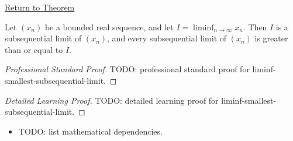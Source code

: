 \newpage
{}
\label{prf:liminf-smallest-subsequential-limit}

\begin{remark*}[Return]
\hyperref[thm:liminf-smallest-subsequential-limit]{Return to Theorem}
\end{remark*}

\begin{theorem*}
Let $(x_n)$ be a bounded real sequence, and let
$I=\liminf_{n\to\infty}x_n$. Then $I$ is a subsequential limit of
$(x_n)$, and every subsequential limit of $(x_n)$ is greater than or
equal to $I$.

\smallskip
\noindent
\end{theorem*}

\begin{proof}[Professional Standard Proof]
\LRAProofBodyStart
TODO: professional standard proof for liminf-smallest-subsequential-limit.
\end{proof}

\begin{proof}[Detailed Learning Proof]
\LRAProofBodyStart
TODO: detailed learning proof for liminf-smallest-subsequential-limit.
\end{proof}

\begin{remark*}
\end{remark*}

\begin{dependencies}
\begin{itemize}
  \item TODO: list mathematical dependencies.
\end{itemize}
\end{dependencies}

\clearpage

